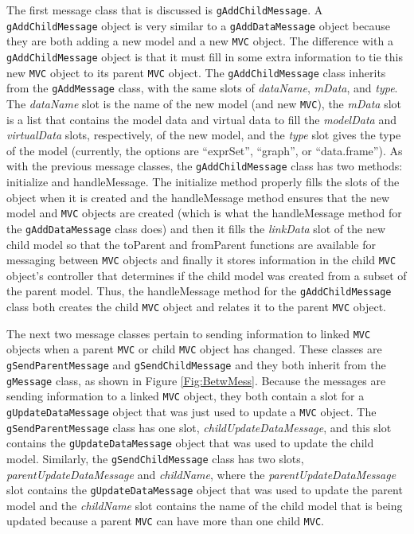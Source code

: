 \documentclass{article}[11pt]
\newcommand{\Rfunction}[1]{{\textsf{#1}}}
\newcommand{\Robject}[1]{{\texttt{#1}}}
\newcommand{\Rslot}[1]{\textsl{#1}}
\newcommand{\Rclass}[1]{\texttt{#1}}
\begin{document}
The first message class that is discussed is
\Rclass{gAddChildMessage}.  A \Robject{gAddChildMessage} object is very
similar to a \Robject{gAddDataMessage} object because they are both adding a
new model and a new \Robject{MVC} object.  The difference with a
\Robject{gAddChildMessage} object is that it must fill in some extra
information to tie this new \Robject{MVC} object to its parent \Robject{MVC}
object.  The \Rclass{gAddChildMessage} class inherits from the
\Rclass{gAddMessage} class, with the same slots of \Rslot{dataName},
\Rslot{mData}, and \Rslot{type}.  The \Rslot{dataName} slot is the name of the
new model (and new \Robject{MVC}), the \Rslot{mData} slot is a list that
contains the
model data and virtual data to fill the \Rslot{modelData} and
\Rslot{virtualData} slots, respectively, of the new model, and the
\Rslot{type} slot gives the type of the model (currently, the options are
``exprSet'', ``graph'', or ``data.frame'').  As with the previous
message classes, the \Rclass{gAddChildMessage} class has two methods:
\Rfunction{initialize} and \Rfunction{handleMessage}.  The
\Rfunction{initialize} method properly fills the slots of the object when it
is created and the \Rfunction{handleMessage} method ensures that the new
model and \Robject{MVC} objects are created (which is what the
\Rfunction{handleMessage} method for the \Rclass{gAddDataMessage} class does)
and then it fills the \Rslot{linkData} slot of the new child model
so that the \Rfunction{toParent} and \Rfunction{fromParent} functions are
available for messaging between \Robject{MVC} objects and finally it stores
information in the child \Robject{MVC} object's controller that determines if
the child model was created from a subset of the parent
model.  Thus, the \Rfunction{handleMessage} method for the
\Rclass{gAddChildMessage} class both creates the child \Robject{MVC} object
and relates it to the parent \Robject{MVC} object. 

The next two message classes pertain to sending information to linked
\Robject{MVC} objects when a parent \Robject{MVC} or child \Robject{MVC}
object has changed.  These classes are \Rclass{gSendParentMessage} and
\Rclass{gSendChildMessage} and they both inherit from the \Rclass{gMessage}
class, as shown in Figure \ref{Fig:BetwMess}.  Because the messages are
sending information to a linked \Robject{MVC} object, they both contain a slot
for a \Robject{gUpdateDataMessage} object that was just used to update a
\Robject{MVC} object.  The \Rclass{gSendParentMessage} class has one slot,
\Rslot{childUpdateDataMessage}, and this slot contains the
\Robject{gUpdateDataMessage} object that was used to update the child
model.  Similarly, the \Rclass{gSendChildMessage} class has two
slots, \Rslot{parentUpdateDataMessage} and \Rslot{childName}, where the
\Rslot{parentUpdateDataMessage} slot contains the \Robject{gUpdateDataMessage}
object that was used to update the parent model and the
\Rslot{childName} slot contains the name of the child model that is
being updated because a parent \Robject{MVC} can have more than one child
\Robject{MVC}.  
\end{document}

